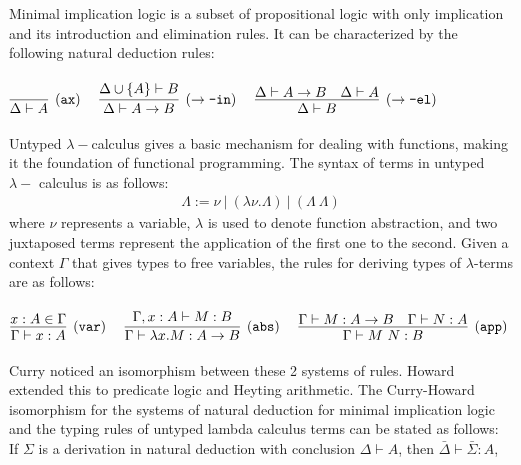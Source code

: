 \documentclass{article}
\begin{document}
	Minimal implication logic is a subset
	of propositional logic with only 
	implication and its introduction 
	and elimination rules. It can be 
	characterized by the following 
	natural deduction rules:\\ \\
	\begin{math}
		\infer[(\texttt{ax})]{\Delta \vdash A}{}
		\ \ \ \ 
		\infer[(\to\texttt{-in})]{\Delta \vdash A \to B}
		{\Delta \cup \{A\} \vdash B}
		\ \ \ \ 
		\infer[(\to\texttt{-el})]{\Delta \vdash B}
		{\Delta \vdash A \to B & \Delta \vdash A}
	\end{math} 
	\\ \\
	Untyped $\lambda-$calculus gives a basic 
	mechanism for dealing with functions, making 
	it the foundation of functional programming.
	The syntax of terms in untyped $\lambda-$
	calculus is as follows:
	\begin{align*}
		\Lambda := \nu\ |\ (\lambda \nu.\Lambda)
		\ |\ (\Lambda\ \Lambda)
	\end{align*}  
	where $\nu$ represents a variable, $\lambda$ 
	is used to denote function abstraction, 
	and two juxtaposed terms represent the 
	application of the first one to the second.
	Given a context $\Gamma$ that gives types 
	to free variables, the rules for deriving 
	types of $\lambda$-terms are as follows: \\ \\
	\begin{math}
		\infer[(\texttt{var})]{\Gamma \vdash x : A}
		{x : A \in \Gamma}
		\ \ \ \ 
		\infer[(\texttt{abs})]
		{\Gamma \vdash \lambda x. M : A \to B}
		{\Gamma, x : A \vdash M : B}
		\ \ \ \ 
		\infer[(\texttt{app})]{\Gamma \vdash M\ N : B}
		{\Gamma \vdash M : A \to B & \Gamma \vdash N : A}
	\end{math} 
	\\ \\
	Curry noticed an isomorphism between these 
	2 systems of rules. Howard extended this to 
	predicate logic and Heyting arithmetic. The 
	Curry-Howard isomorphism for the systems 
	of natural deduction for minimal implication 
	logic and the typing rules of untyped lambda 
	calculus terms can be stated as follows:\\

	\noindent If $\Sigma$ is a derivation in natural 
	deduction with conclusion $\Delta \vdash A$,
	then $\bar{\Delta} \vdash \bar{\Sigma} : A$,\\
	
\end{document}
